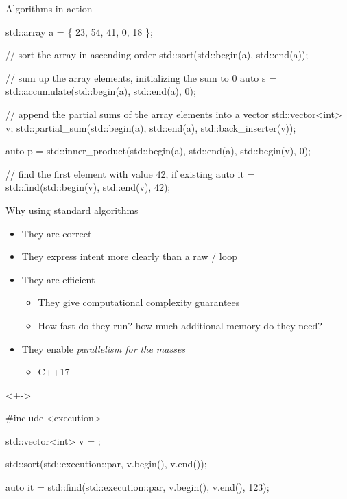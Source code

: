 \begin{frame}[fragile]{Algorithms in action}

  \begin{codeblock}
std::array a = \{ 23, 54, 41, 0, 18 \};

// sort the array in ascending order
std::sort(std::begin(a), std::end(a));

// sum up the array elements, initializing the sum to 0
auto s = std::accumulate(std::begin(a), std::end(a), 0);

// append the partial sums of the array elements into a vector
std::vector<int> v;
std::partial\_sum(std::begin(a), std::end(a), std::back\_inserter(v));

auto p = std::inner_product(std::begin(a), std::end(a), std::begin(v), 0);

// find the first element with value 42, if existing
auto it = std::find(std::begin(v), std::end(v), 42);\end{codeblock}

\end{frame}

\begin{frame}[fragile]{Why using standard algorithms}

  \begin{itemize}[<+->]
  \item They are correct
  \item They express intent more clearly than a raw / loop
  \item They are efficient
    \begin{itemize}
    \item They give computational complexity guarantees
    \item How fast do they run? how much additional memory do they need?
    \end{itemize}
  \item They enable \textit{parallelism for the masses}
    \begin{itemize}[<.->]
    \item C++17
    \end{itemize}
  \end{itemize}

  \begin{codeblock}<+->{
#include <execution>

std::vector<int> v = \ddd;

std::sort(\alert{std::execution::par}, v.begin(), v.end());

auto it = std::find(\alert{std::execution::par}, v.begin(), v.end(), 123);
}\end{codeblock}

\end{frame}

